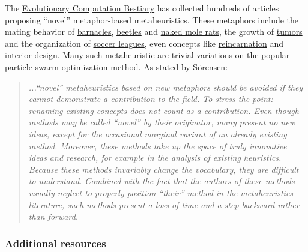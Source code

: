 \documentclass[letterpaper, 12pt]{article}
\begin{document}
The \href{https://fcampelo.github.io/EC-Bestiary/}{Evolutionary Computation Bestiary} has collected hundreds of articles proposing ``novel'' metaphor-based metaheuristics. These metaphors include the mating behavior of \href{https://doi.org/10.1007/978-981-13-3708-6_18}{barnacles}, \href{https://doi.org/10.1088/1757-899x/782/5/052028}{beetles} and \href{https://doi.org/10.1007/s00521-019-04464-7}{naked mole rats}, the growth of \href{https://doi.org/10.1016/j.asoc.2015.07.045}{tumors} and the organization of \href{http://dx.doi.org/10.4236/ijis.2014.41002}{soccer leagues}, even concepts like \href{https://doi.org/10.1109/CINTI.2010.5672231}{reincarnation} and \href{https://doi.org/10.1016/j.isatra.2014.03.018}{interior design}. Many such metaheuristic are trivial variations on the popular \href{https://en.wikipedia.org/wiki/Particle_swarm_optimization}{particle swarm optimization} method. As stated by \href{https://doi.org/10.1111/itor.12001}{S\"orensen}:

\begin{quote}
    \textit{...``novel'' metaheuristics based on new metaphors should be avoided if they cannot demonstrate a contribution to the field. To stress the point: renaming existing concepts does not count as a contribution. Even though methods may be called ``novel'' by their originator, many present no new ideas, except for the occasional marginal variant of an already existing method. Moreover, these methods take up the space of truly innovative ideas and research, for example in the analysis of existing heuristics. Because these methods invariably change the vocabulary, they are difficult to understand. Combined with the fact that the authors of these methods usually neglect to properly position ``their'' method in the metaheuristics literature, such methods present a loss of time and a step backward rather than forward.}
\end{quote}

\subsubsection*{Additional resources}
\end{document}
